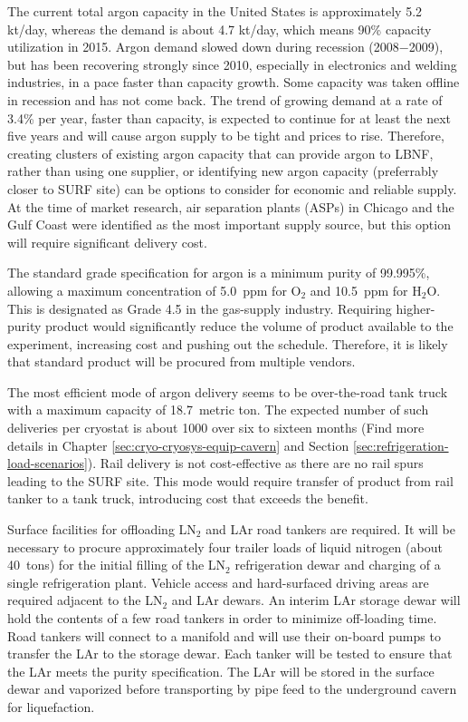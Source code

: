 The current total argon capacity in the United States is approximately 5.2 kt/day, 
whereas the demand is about 4.7 kt/day, which means 90\% capacity utilization in 
2015. Argon demand slowed down during recession (2008$-$2009), but has been 
recovering strongly since 2010, especially in electronics and welding industries, 
in a pace faster than capacity growth. Some capacity was taken offline in recession 
and has not come back. The trend of growing demand at a rate of 3.4\% per year, 
faster than capacity, is expected to continue for at least the next five years and 
will cause argon supply to be tight and prices to rise. Therefore, creating clusters 
of existing argon capacity that can provide argon to LBNF, rather than using one 
supplier, or identifying new argon capacity (preferrably closer to SURF site) can 
be options to consider for economic and reliable supply. At the time of market 
research, air separation plants (ASPs) in Chicago and the Gulf Coast were 
identified as the most important supply source, but this option will 
require significant delivery cost.

The standard grade specification for argon is a minimum purity of
 99.995\%, allowing a maximum concentration of 5.0~ppm for O$_2$ 
and 10.5~ppm for H$_{2}$O.  This is designated as Grade 4.5 in 
the gas-supply industry.  Requiring higher-purity product would 
significantly reduce the volume of product available to the 
experiment, increasing cost and pushing out the schedule.  
Therefore, it is likely that standard product will be 
procured from multiple vendors.  

The most efficient mode of argon delivery seems to be
over-the-road tank truck with a maximum capacity of 18.7~metric ton.  
The expected number of such deliveries per cryostat is about 1000 
over six to sixteen months (Find more details in 
Chapter \ref{sec:cryo-cryosys-equip-cavern} and Section 
\ref{sec:refrigeration-load-scenarios}). 
Rail delivery is not cost-effective as there are no rail spurs leading
to the SURF site. This mode would require transfer of product from rail 
tanker to a tank truck, introducing cost that exceeds the benefit.

Surface facilities for offloading LN$_{2}$ and LAr road tankers are 
required. It will be necessary to  procure approximately four trailer 
loads of liquid nitrogen (about 40~tons) for the initial filling of 
the LN$_{2}$ refrigeration dewar and charging of a single refrigeration 
plant. Vehicle access and hard-surfaced driving areas are required 
adjacent to the LN$_{2}$ and LAr dewars. An interim 
LAr storage dewar will hold the contents of a few road tankers in order 
to minimize off-loading time.  Road tankers will connect to a 
manifold and will use their on-board pumps to transfer the LAr 
to the storage dewar. Each tanker will be tested to ensure that 
the LAr meets the purity specification. The LAr will be 
stored in the surface dewar and vaporized before transporting 
by pipe feed to the underground cavern for liquefaction.

